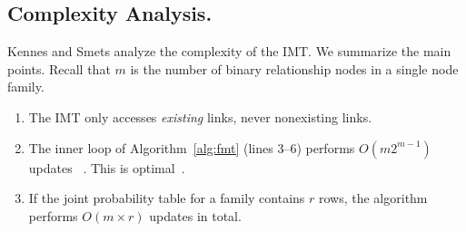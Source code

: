 \documentclass[oribibl]{llncs}
\begin{document}
\subsection{Complexity Analysis.} Kennes and Smets \cite{Kennes1990} analyze the complexity of the IMT. We summarize the main points. Recall that $m$ is the number of binary relationship nodes in a single node family.

\begin{enumerate}
\item The IMT only accesses {\em existing} links, never nonexisting links.
\item The inner loop of Algorithm~\ref{alg:fmt}  (lines 3--6) performs $O(m 2^{m-1})$ updates ~\cite{Kennes1990}. This is optimal~\cite[Cor.1]{Kennes1990}.
\item If the joint probability table for a family contains $r$ rows, the algorithm performs $O(m \times r)$ updates in total.
\end{enumerate}
\end{document}
